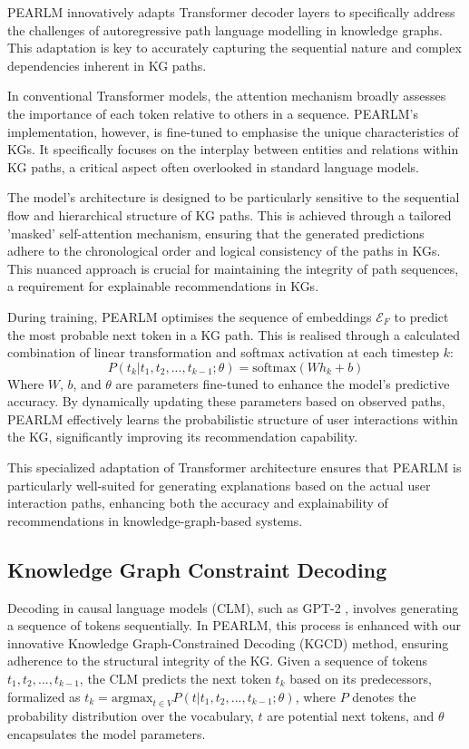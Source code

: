 \documentclass[sigconf]{acmart}
\begin{document}
PEARLM innovatively adapts Transformer decoder layers to specifically address the challenges of autoregressive path language modelling in knowledge graphs. This adaptation is key to accurately capturing the sequential nature and complex dependencies inherent in KG paths.

In conventional Transformer models, the attention mechanism broadly assesses the importance of each token relative to others in a sequence. PEARLM's implementation, however, is fine-tuned to emphasise the unique characteristics of KGs. It specifically focuses on the interplay between entities and relations within KG paths, a critical aspect often overlooked in standard language models.

The model's architecture is designed to be particularly sensitive to the sequential flow and hierarchical structure of KG paths. This is achieved through a tailored 'masked' self-attention mechanism, ensuring that the generated predictions adhere to the chronological order and logical consistency of the paths in KGs. This nuanced approach is crucial for maintaining the integrity of path sequences, a requirement for explainable recommendations in KGs.

During training, PEARLM optimises the sequence of embeddings $\mathcal{E}_{F}$ to predict the most probable next token in a KG path. This is realised through a calculated combination of linear transformation and softmax activation at each timestep $k$:
$$
P(t_k | t_1, t_2, ..., t_{k-1}; \theta) = \text{softmax}(W h_k + b)
$$
Where \( W \), \( b \), and \( \theta \) are parameters fine-tuned to enhance the model’s predictive accuracy. By dynamically updating these parameters based on observed paths, PEARLM effectively learns the probabilistic structure of user interactions within the KG, significantly improving its recommendation capability.

This specialized adaptation of Transformer architecture ensures that PEARLM is particularly well-suited for generating explanations based on the actual user interaction paths, enhancing both the accuracy and explainability of recommendations in knowledge-graph-based systems.

\subsection{Knowledge Graph Constraint Decoding}
Decoding in causal language models (CLM), such as GPT-2 \cite{radford2019language}, involves generating a sequence of tokens sequentially. In PEARLM, this process is enhanced with our innovative Knowledge Graph-Constrained Decoding (KGCD) method, ensuring adherence to the structural integrity of the KG. Given a sequence of tokens $t_1, t_2, ..., t_{k-1}$, the CLM predicts the next token $t_k$ based on its predecessors, formalized as $t_k = \text{argmax}_{t \in V} P(t | t_1, t_2, ..., t_{k-1}; \theta)$, where $P$ denotes the probability distribution over the vocabulary, $t$ are potential next tokens, and $\theta$ encapsulates the model parameters.
\end{document}
